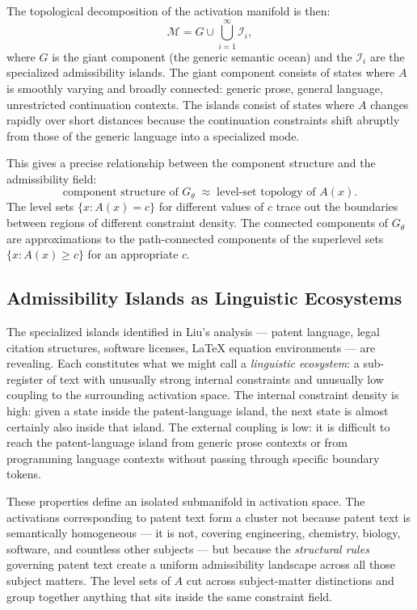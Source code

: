 \documentclass[12pt, a4paper]{article}
\theoremstyle{plain}
\theoremstyle{definition}
\theoremstyle{remark}
\newcommand{\cM}{\mathcal{M}}
\newcommand{\cI}{\mathcal{I}}
\newcommand{\fA}{A}
\begin{document}
The topological decomposition of the activation manifold is then:
\begin{equation}
  \cM = G \cup \bigcup_{i=1}^\infty \cI_i,
\end{equation}
where $G$ is the giant component (the generic semantic ocean) and the $\cI_i$
are the specialized admissibility islands. The giant component consists of
states where $\fA$ is smoothly varying and broadly connected: generic prose,
general language, unrestricted continuation contexts. The islands consist of
states where $\fA$ changes rapidly over short distances because the continuation
constraints shift abruptly from those of the generic language into a specialized
mode.

This gives a precise relationship between the component structure and the
admissibility field:
\begin{equation}
  \text{component structure of } G_\theta
  \;\approx\;
  \text{level-set topology of } \fA(x).
\end{equation}
The level sets $\{x : \fA(x) = c\}$ for different values of $c$ trace out the
boundaries between regions of different constraint density. The connected
components of $G_\theta$ are approximations to the path-connected components
of the superlevel sets $\{x : \fA(x) \geq c\}$ for an appropriate $c$.

\subsection{Admissibility Islands as Linguistic Ecosystems}

The specialized islands identified in Liu's analysis --- patent language, legal
citation structures, software licenses, LaTeX equation environments ---
are revealing. Each constitutes what we might call a \emph{linguistic ecosystem}:
a sub-register of text with unusually strong internal constraints and unusually
low coupling to the surrounding activation space. The internal constraint density
is high: given a state inside the patent-language island, the next state is
almost certainly also inside that island. The external coupling is low: it is
difficult to reach the patent-language island from generic prose contexts or
from programming language contexts without passing through specific boundary
tokens.

These properties define an isolated submanifold in activation space. The
activations corresponding to patent text form a cluster not because patent
text is semantically homogeneous --- it is not, covering engineering, chemistry,
biology, software, and countless other subjects --- but because the
\emph{structural rules} governing patent text create a uniform admissibility
landscape across all those subject matters. The level sets of $\fA$ cut across
subject-matter distinctions and group together anything that sits inside the
same constraint field.
\end{document}
